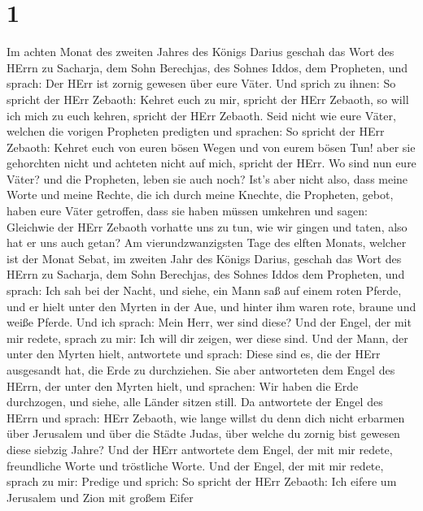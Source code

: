 \hypertarget{section}{%
\section{1}\label{section}}

 Im achten Monat des zweiten Jahres des Königs Darius
geschah das Wort des HErrn zu Sacharja, dem Sohn Berechjas, des Sohnes
Iddos, dem Propheten, und sprach:  Der HErr ist zornig
gewesen über eure Väter.  Und sprich zu ihnen: So spricht
der HErr Zebaoth: Kehret euch zu mir, spricht der HErr Zebaoth, so will
ich mich zu euch kehren, spricht der HErr Zebaoth.  Seid
nicht wie eure Väter, welchen die vorigen Propheten predigten und
sprachen: So spricht der HErr Zebaoth: Kehret euch von euren bösen Wegen
und von eurem bösen Tun! aber sie gehorchten nicht und achteten nicht
auf mich, spricht der HErr.  Wo sind nun eure Väter? und die
Propheten, leben sie auch noch?  Ist's aber nicht also, dass
meine Worte und meine Rechte, die ich durch meine Knechte, die
Propheten, gebot, haben eure Väter getroffen, dass sie haben müssen
umkehren und sagen: Gleichwie der HErr Zebaoth vorhatte uns zu tun, wie
wir gingen und taten, also hat er uns auch getan?  Am
vierundzwanzigsten Tage des elften Monats, welcher ist der Monat Sebat,
im zweiten Jahr des Königs Darius, geschah das Wort des HErrn zu
Sacharja, dem Sohn Berechjas, des Sohnes Iddos dem Propheten, und
sprach:  Ich sah bei der Nacht, und siehe, ein Mann saß auf
einem roten Pferde, und er hielt unter den Myrten in der Aue, und hinter
ihm waren rote, braune und weiße Pferde.  Und ich sprach:
Mein Herr, wer sind diese? Und der Engel, der mit mir redete, sprach zu
mir: Ich will dir zeigen, wer diese sind.  Und der Mann,
der unter den Myrten hielt, antwortete und sprach: Diese sind es, die
der HErr ausgesandt hat, die Erde zu durchziehen.  Sie aber
antworteten dem Engel des HErrn, der unter den Myrten hielt, und
sprachen: Wir haben die Erde durchzogen, und siehe, alle Länder sitzen
still.  Da antwortete der Engel des HErrn und sprach: HErr
Zebaoth, wie lange willst du denn dich nicht erbarmen über Jerusalem und
über die Städte Judas, über welche du zornig bist gewesen diese siebzig
Jahre?  Und der HErr antwortete dem Engel, der mit mir
redete, freundliche Worte und tröstliche Worte.  Und der
Engel, der mit mir redete, sprach zu mir: Predige und sprich: So spricht
der HErr Zebaoth: Ich eifere um Jerusalem und Zion mit großem Eifer

